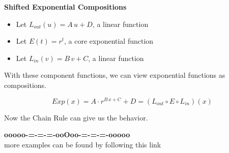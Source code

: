 \documentclass{ximera}
\begin{document}
\begin{idea}  \textbf{\textcolor{blue!55!black}{Shifted Exponential Compositions}} 




\begin{itemize}
\item Let $L_{out}(u) = A \, u + D$, a linear function
\item Let $E(t) = r^t$, a core exponential function
\item Let $L_{in}(v) = B \, v + C$, a linear function
\end{itemize}

With these component functions, we can view exponential functions as compositions.


\[  Exp(x) =    A \cdot r^{B \, x + C} + D= (L_{out} \circ E \circ L_{in})(x) \]


Now the Chain Rule can give us the behavior.

\end{idea}


















\begin{onlineOnly}
\begin{center}
\textbf{\textcolor{green!50!black}{ooooo-=-=-=-ooOoo-=-=-=-ooooo}} \\

more examples can be found by following this link\\ 

\end{center}
\end{onlineOnly}
\end{document}
